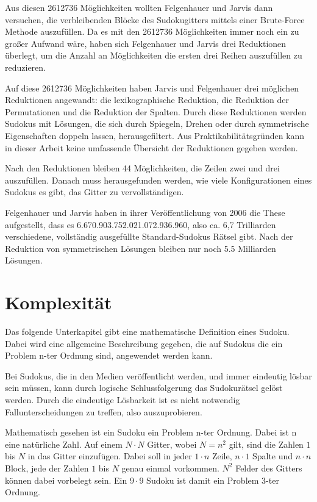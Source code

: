 Aus diesen 2612736 Möglichkeiten wollten Felgenhauer und Jarvis dann versuchen, die verbleibenden Blöcke des Sudokugitters mittels einer Brute-Force Methode auszufüllen. Da es mit den 2612736 Möglichkeiten immer noch ein zu großer Aufwand wäre, haben sich Felgenhauer und Jarvis drei Reduktionen überlegt, um die Anzahl an Möglichkeiten die ersten drei Reihen auszufüllen zu reduzieren.

Auf diese 2612736 Möglichkeiten haben Jarvis und Felgenhauer drei möglichen Reduktionen angewandt: die lexikographische Reduktion, die Reduktion der Permutationen und die Reduktion der Spalten. Durch diese Reduktionen werden Sudokus mit Lösungen, die sich durch Spiegeln, Drehen oder durch symmetrische Eigenschaften doppeln lassen, herausgefiltert. Aus Praktikabilitätsgründen kann in dieser Arbeit keine umfassende Übersicht der Reduktionen gegeben werden.

Nach den Reduktionen bleiben 44 Möglichkeiten, die Zeilen zwei und drei auszufüllen. Danach muss herausgefunden werden, wie viele Konfigurationen eines Sudokus es gibt, das Gitter zu vervollständigen. 

Felgenhauer und Jarvis haben in ihrer Veröffentlichung von 2006 die These aufgestellt, dass es 6.670.903.752.021.072.936.960, also ca. 6,7 Trilliarden  verschiedene, vollständig ausgefüllte Standard-Sudokus Rätsel gibt. Nach der Reduktion von symmetrischen Lösungen bleiben nur noch 5.5 Milliarden Lösungen. \cite{FelgenhauerJarvis}

\section{Komplexität}
Das folgende Unterkapitel gibt eine mathematische Definition eines Sudoku. Dabei wird eine allgemeine Beschreibung gegeben, die auf Sudokus die ein Problem n-ter Ordnung sind, angewendet werden kann.

Bei Sudokus, die in den Medien veröffentlicht werden, und immer eindeutig lösbar sein müssen, kann durch logische Schlussfolgerung das Sudokurätsel gelöst werden. Durch die eindeutige Lösbarkeit ist es nicht notwendig Fallunterscheidungen zu treffen, also auszuprobieren.

Mathematisch gesehen ist ein Sudoku ein Problem n-ter Ordnung. Dabei ist n eine natürliche Zahl. Auf einem $N\cdot N$ Gitter, wobei $N=n^2$ gilt, sind die Zahlen $1$ bis $N$ in das Gitter einzufügen. Dabei soll in jeder $1\cdot n$ Zeile, $n\cdot 1$ Spalte und $n\cdot n$ Block, jede der Zahlen $1$ bis $N$ genau einmal vorkommen. $N^2$ Felder des Gitters können dabei vorbelegt sein. Ein $9\cdot9$ Sudoku ist damit ein Problem 3-ter Ordnung.

